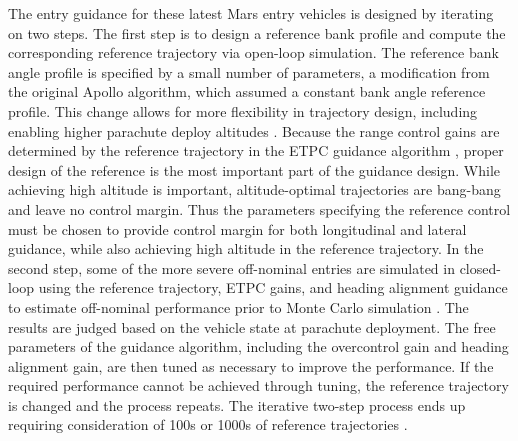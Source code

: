 \documentclass[journal ]{new-aiaa}
\begin{document}
The entry guidance for these latest Mars entry vehicles \cite{MSL_EDL2,M2020_EDL} is designed by iterating on two steps. The first step is to design a reference bank profile and compute the corresponding reference trajectory via open-loop simulation. The reference bank angle profile is specified by a small number of parameters, a modification from the original Apollo algorithm, which assumed a constant bank angle reference profile. This change allows for more flexibility in trajectory design, including enabling higher parachute deploy altitudes \cite{MSL_EDL2}. Because the range control gains are determined by the reference trajectory in the ETPC guidance algorithm \cite{Apollo}, proper design of the reference is the most important part of the guidance design. While achieving high altitude is important, altitude-optimal trajectories are bang-bang \cite{HighElevation,AltitudeOptimizationIndirect} and leave no control margin. Thus the parameters specifying the reference control must be chosen to provide control margin for both longitudinal and lateral guidance, while also achieving high altitude in the reference trajectory.
In the second step, some of the more severe off-nominal entries are simulated in closed-loop using the reference trajectory, ETPC gains, and heading alignment guidance to estimate off-nominal performance prior to Monte Carlo simulation \cite{MSL_EDL2}. The results are judged based on the vehicle state at parachute deployment. The free parameters of the guidance algorithm, including the overcontrol gain and heading alignment gain, are then tuned as necessary to improve the performance. If the required performance cannot be achieved through tuning, the reference trajectory is changed and the process repeats. The iterative two-step process ends up requiring consideration of 100s or 1000s of reference trajectories \cite{MSL_EDL2}.
% 

\end{document}
